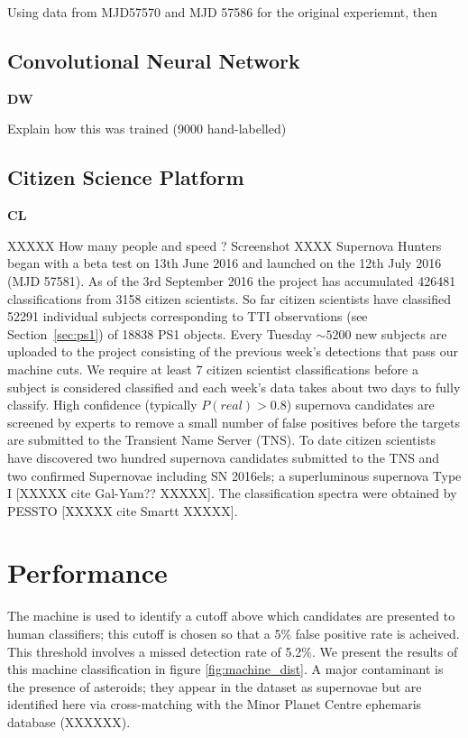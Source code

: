 \documentclass[a4paper,fleqn,usenatbib]{mnras}
\begin{document}
Using data from MJD57570 and MJD 57586 for the original experiemnt, then 

\subsection{Convolutional Neural Network}

\textbf{DW}

Explain how this was trained (9000 hand-labelled) 
\subsection{Citizen Science Platform}

\textbf{CL}

XXXXX How many people and speed ? Screenshot XXXX 
Supernova Hunters began with a beta test on 13th June 2016 and launched on the 12th July 2016 (MJD 57581).  As of the 3rd September 2016 the project has accumulated 426481 classifications from 3158 citizen scientists.  So far citizen scientists have classified 52291 individual subjects corresponding to TTI observations (see Section~\ref{sec:ps1}) of 18838 PS1 objects.  Every Tuesday $\sim5200$ new subjects are uploaded to the project consisting of the previous week's detections that pass our machine cuts.  We require at least 7 citizen scientist classifications before a subject is considered classified and each week's data takes about two days to fully classify.  High confidence (typically $P(real)>0.8$) supernova candidates are screened by experts to remove a small number of false positives before the targets are submitted to the Transient Name Server (TNS).  To date citizen scientists have discovered two hundred supernova candidates submitted to the TNS and two confirmed Supernovae including SN 2016els; a superluminous supernova Type I [XXXXX cite Gal-Yam?? XXXXX].  The classification spectra were obtained by PESSTO [XXXXX cite Smartt XXXXX].
\section{Performance}

The machine is used to identify a cutoff above which candidates are presented to human classifiers; this cutoff is chosen so that a 5\% false positive rate is acheived. This threshold involves a missed detection rate of 5.2\%. We present the results of this machine classification in figure \ref{fig:machine_dist}. A major contaminant is the presence of asteroids; they appear in the dataset as supernovae but are identified here via cross-matching with the Minor Planet Centre ephemaris database (XXXXXX). 
\end{document}
